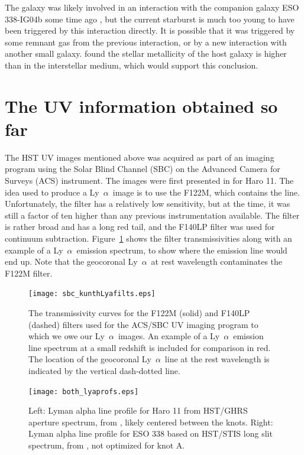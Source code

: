 \documentclass[a4wide,12pt]{book}
\newcommand{\lya}{Ly~${\alpha}$}
\begin{document}
{The galaxy was likely involved in an interaction with the companion galaxy ESO 338-IG04b some time ago \citep[see][who show a bridge of H {\sc i} gas connects the two galaxies]{cannon-2004}, but the current starburst is much too young to have been triggered by this interaction directly. It is possible that it was triggered by some remnant gas from the previous interaction, or by a new interaction with another small galaxy. \citet{bergvall-ostlin2002} found the stellar metallicity of the host galaxy is higher than in the interstellar medium, which would support this conclusion.


\section{The UV information obtained so far}
The HST UV images mentioned above was acquired as part of an imaging program using the Solar Blind Channel (SBC) on the Advanced Camera for Surveys (ACS) instrument. The images were first presented in \citet{kunth-2003} for Haro 11. The idea used to produce a \lya\ image is to use the F122M, which contains the line. Unfortunately, the filter has a relatively low sensitivity, but at the time, it was still a factor of ten higher than any previous instrumentation available. The filter is rather broad and has a long red tail, and the F140LP filter was used for continuum subtraction. Figure~\ref{Fig:sbc_filts} shows the filter transmissivities along with an example of a \lya\ emission spectrum, to show where the emission line would end up. Note that the geocoronal \lya\ at rest wavelength contaminates the F122M filter.

\begin{figure}
   \centering
   \texttt{[image: sbc\_kunthLyafilts.eps]}
   \caption{The transmissivity curves for the F122M (solid) and F140LP (dashed) filters used for the ACS/SBC UV imaging program to which we owe our \lya\ images. An example of a \lya\ emission line spectrum at a small redshift is included for comparison in red. The location of the geocoronal \lya\ line at the rest wavelength is indicated by the vertical dash-dotted line.}
              \label{Fig:sbc_filts}
    \end{figure}
    
\begin{figure}
   \centering
   \texttt{[image: both\_lyaprofs.eps]}
   \caption{Left: Lyman alpha line profile for Haro 11 from HST/GHRS aperture spectrum, from \citep{kunth-1998}, likely centered between the knots. Right: Lyman alpha line profile for ESO 338 based on HST/STIS long slit spectrum, from \citet{hayes-2005}, not optimized for knot A.}
              \label{Fig:both_lyaprofs}
    \end{figure}

}
\end{document}
